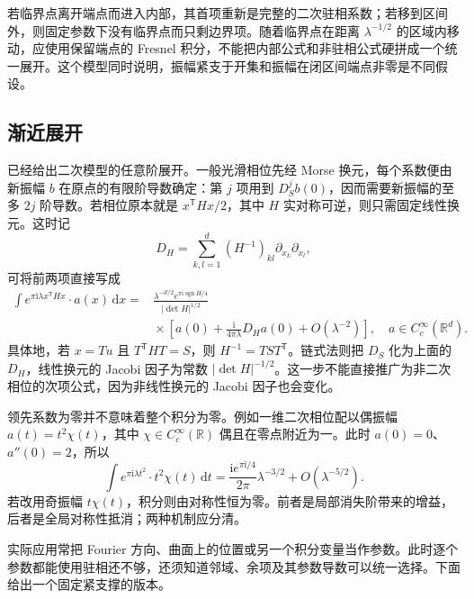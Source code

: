 \ProseParagraphBreak

若临界点离开端点而进入内部，其首项重新是完整的二次驻相系数；若移到区间外，则固定参数下没有临界点而只剩边界项。随着临界点在距离 \(\lambda^{-1/2}\) 的区域内移动，应使用保留端点的 Fresnel 积分，不能把内部公式和非驻相公式硬拼成一个统一展开。这个模型同时说明，振幅紧支于开集和振幅在闭区间端点非零是不同假设。

\subsection{渐近展开}
\label{b2:subsec:210204}

已经给出二次模型的任意阶展开。一般光滑相位先经 Morse 换元，每个系数便由新振幅 \(b\) 在原点的有限阶导数确定：第 \(j\) 项用到 \(D_S^jb(0)\)，因而需要新振幅的至多 \(2j\) 阶导数。若相位原本就是 \(x^{\mathsf T}Hx/2\)，其中 \(H\) 实对称可逆，则只需固定线性换元。这时记
\[
 D_H=\sum_{k,l=1}^d(H^{-1})_{kl}\partial_{x_k}\partial_{x_l},
\]
可将前两项直接写成
\[
 \begin{aligned}
 \int e^{\pi\mathrm i\lambda x^{\mathsf T}Hx}
                  \cdot a(x)\,\mathrm dx
 ={}&\frac{\lambda^{-d/2}e^{\pi\mathrm i\operatorname{sgn}H/4}}
             {|\det H|^{1/2}}\\
 &{}\times
 \left[a(0)+\frac{\mathrm i}{4\pi\lambda}D_Ha(0)
               +O(\lambda^{-2})\right],
 \quad a\in C_c^\infty(\mathbb R^d).
 \end{aligned}
\]
具体地，若 \(x=Tu\) 且 \(T^{\mathsf T}HT=S\)，则
\(H^{-1}=TST^{\mathsf T}\)。链式法则把 \(D_S\) 化为上面的 \(D_H\)，线性换元的 Jacobi 因子为常数 \(|\det H|^{-1/2}\)。这一步不能直接推广为非二次相位的次项公式，因为非线性换元的 Jacobi 因子也会变化。

\ProseParagraphBreak
领先系数为零并不意味着整个积分为零。例如一维二次相位配以偶振幅 \(a(t)=t^2\chi(t)\)，其中 \(\chi\in C_c^\infty(\mathbb R)\) 偶且在零点附近为一。此时 \(a(0)=0\)、\(a''(0)=2\)，所以
\[
 \int e^{\pi\mathrm i\lambda t^2}\cdot t^2\chi(t)\,\mathrm dt
 =\frac{\mathrm i e^{\pi\mathrm i/4}}{2\pi}
        \lambda^{-3/2}+O(\lambda^{-5/2}).
\]
若改用奇振幅 \(t\chi(t)\)，积分则由对称性恒为零。前者是局部消失阶带来的增益，后者是全局对称性抵消；两种机制应分清。

\ProseParagraphBreak

实际应用常把 Fourier 方向、曲面上的位置或另一个积分变量当作参数。此时逐个参数都能使用驻相还不够，还须知道邻域、余项及其参数导数可以统一选择。下面给出一个固定紧支撑的版本。

